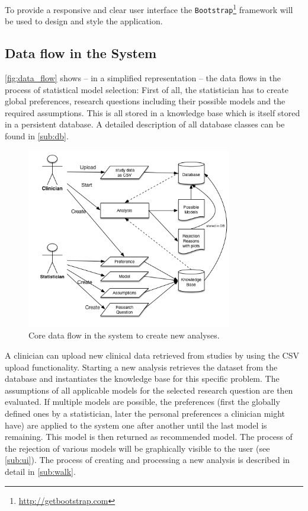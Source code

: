 To provide a responsive and clear user interface the \texttt{Bootstrap}\footnote{\href{http://getbootstrap.com}{http://getbootstrap.com}} framework will be used to design and style the application. 

\subsection{Data flow in the System}

\autoref{fig:data_flow} shows -- in a simplified representation -- the data flows in the process of statistical model selection: First of all, the statistician has to create global preferences, research questions including their possible models and the required assumptions. This is all stored in a knowledge base which is itself stored in  a persistent database. A detailed description of all database classes can be found in \autoref{sub:db}. 

\begin{figure}[!h]
\centering
\includegraphics[width=0.8\textwidth]{figures/data_flow}
\caption{Core data flow in the system to create new analyses.}
\label{fig:data_flow}
\end{figure}


A clinician can upload new clinical data retrieved from studies by using the CSV upload functionality. Starting a new analysis retrieves the dataset from the database and instantiates the knowledge base for this specific problem. The assumptions of all applicable models for the selected research question are then evaluated. If multiple models are possible, the preferences (first the globally defined ones by a statistician, later the personal preferences a clinician might have) are applied to the system one after another until the last model is remaining. This model is then returned as recommended model. The process of the rejection of various models will be graphically visible to the user (see \autoref{sub:ui}). The process of creating and processing a new analysis is described in detail in \autoref{sub:walk}.


